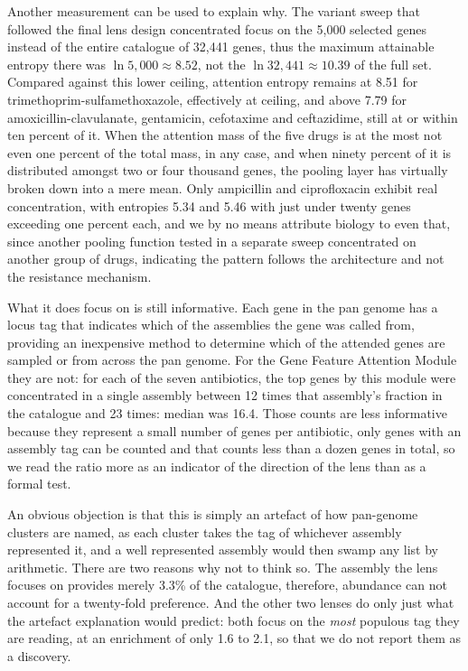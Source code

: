 \documentclass[journal]{IEEEtran}
\begin{document}
Another measurement can be used to explain why. The variant sweep that followed the
final lens design concentrated focus on the 5{,}000 selected genes instead of the
entire catalogue of 32{,}441 genes, thus the maximum attainable entropy there was
$\ln 5{,}000 \approx 8.52$, not the $\ln 32{,}441 \approx 10.39$ of the full set.
Compared against this lower ceiling, attention entropy remains at 8.51 for
trimethoprim-sulfamethoxazole, effectively at ceiling, and above 7.79 for
amoxicillin-clavulanate, gentamicin, cefotaxime and ceftazidime, still at or within
ten percent of it. When the attention mass of the five drugs is at the most not even
one percent of the total mass, in any case, and when ninety percent of it is
distributed amongst two or four thousand genes, the pooling layer has virtually broken
down into a mere mean. Only ampicillin and ciprofloxacin exhibit real concentration,
with entropies 5.34 and 5.46 with just under twenty genes exceeding one percent each,
and we by no means attribute biology to even that, since another pooling function
tested in a separate sweep concentrated on another group of drugs, indicating the
pattern follows the architecture and not the resistance mechanism.

What it does focus on is still informative. Each gene in the pan genome has a locus
tag that indicates which of the assemblies the gene was called from, providing an
inexpensive method to determine which of the attended genes are sampled or from across
the pan genome. For the Gene Feature Attention Module they are not: for each of the
seven antibiotics, the top genes by this module were concentrated in a single assembly
between 12 times that assembly's fraction in the catalogue and 23 times: median was
16.4. Those counts are less informative because they represent a small number of genes
per antibiotic, only genes with an assembly tag can be counted and that counts less
than a dozen genes in total, so we read the ratio more as an indicator of the
direction of the lens than as a formal test.

An obvious objection is that this is simply an artefact of how pan-genome clusters are
named, as each cluster takes the tag of whichever assembly represented it, and a well
represented assembly would then swamp any list by arithmetic. There are two reasons
why not to think so. The assembly the lens focuses on provides merely 3.3\% of the
catalogue, therefore, abundance can not account for a twenty-fold preference. And the
other two lenses do only just what the artefact explanation would predict: both focus
on the \textit{most} populous tag they are reading, at an enrichment of only 1.6 to
2.1, so that we do not report them as a discovery.
\end{document}
